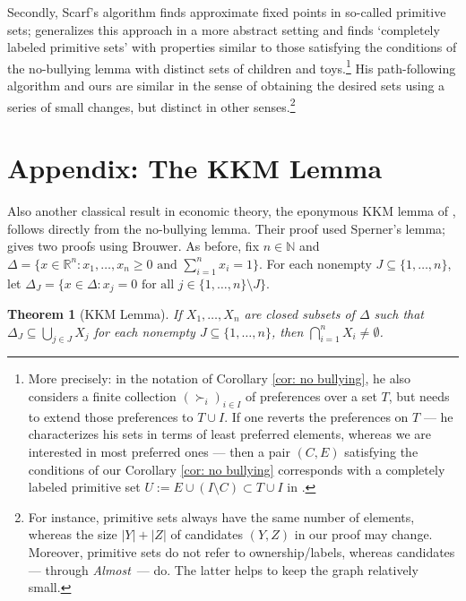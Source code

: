 \documentclass[english, 11pt]{article}
\theoremstyle{plain} %
\newtheorem{theorem}{Theorem}[section]
\theoremstyle{definition}
\newcommand{\alm}{\textsl{Almost}}
\begin{document}
Secondly, Scarf's algorithm finds approximate fixed points in so-called primitive sets; \citet{Tuy1979} generalizes this approach in a more abstract setting and finds `completely labeled primitive sets' with properties similar to those satisfying the conditions of the no-bullying lemma with distinct sets of children and toys.\footnote{More precisely: in the notation of Corollary \ref{cor: no bullying}, he also considers a finite collection $(\succ_i)_{i \in I}$ of preferences over a set $T$, but needs to extend those preferences to $T \cup I$. If one reverts the preferences on $T$ --- he characterizes his sets in terms of least preferred elements, whereas we are interested in most preferred ones --- then a pair $(C, E)$ satisfying the conditions of our Corollary \ref{cor: no bullying} corresponds with a completely labeled primitive set $U := E \cup (I \setminus C) \subset T \cup I$ in \citet{Tuy1979}.} His path-following algorithm and ours are similar in the sense of obtaining the desired sets using a series of small changes, but distinct in other senses.\footnote{For instance, primitive sets always have the same number of elements, whereas the size $|Y| + |Z|$ of candidates $(Y, Z)$ in our proof may change. Moreover, primitive sets do not refer to ownership/labels, whereas candidates --- through \alm\ --- do. The latter helps to keep the graph relatively small.}

\appendix
\section{Appendix: The KKM Lemma}

Also another classical result in economic theory, the eponymous KKM lemma of \citet{KKM1929}, follows directly from the no-bullying lemma. Their proof used Sperner's lemma; \citet[Sec. 9]{Border1985} gives two proofs using Brouwer. As before, fix $n \in \mathbb{N}$ and $\Delta = \{x \in \mathbb{R}^n: x_1, \ldots, x_n \geq 0 \text{ and } \sum_{i=1}^n x_i = 1\}$. For each nonempty $J \subseteq \{1, \ldots, n\}$, let $\Delta_J = \{x \in \Delta: x_j = 0 \text{ for all } j \in \{1, \ldots, n\} \setminus J\}$.

\begin{theorem} [KKM Lemma]
If $X_1, \ldots, X_n$ are closed subsets of $\Delta$ such that $\Delta_J \subseteq \bigcup_{j \in J} X_j$ for each nonempty $J \subseteq \{1, \ldots, n\}$, then $\bigcap_{i=1}^n X_i \neq \emptyset$.
\end{theorem}
\end{document}
